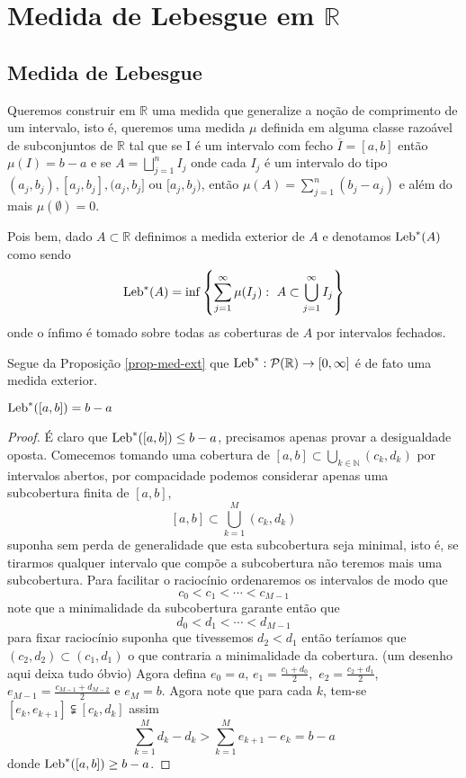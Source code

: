 \chapter[Aula 3]{Medida de Lebesgue em $\mathbb{R}$}
\chaptermark{}






\section*{Medida de Lebesgue}


Queremos construir em $\mathbb{R}$ uma medida que 
generalize a noção de comprimento de  
um intervalo, isto é, queremos uma medida  
$\mu$ definida em alguma classe razoável de 
subconjuntos de $\mathbb{R}$ tal que se I é um intervalo
com fecho $\overline{I}=[a,b]$ então $\mu(I)=b-a$ 
e se $A=\bigsqcup_{j=1}^nI_j$ onde cada $I_j$ 
é um intervalo do tipo $(a_j,b_j), [a_j,b_j],(a_j,b_j]$ ou $[a_j,b_j)$,  
então $\mu(A)=\sum_{j=1}^n(b_j-a_j)$ e
além do mais $\mu(\emptyset)=0$.



Pois bem, dado $A\subset \mathbb{R}$ 
definimos a medida exterior de $A$ e 
denotamos $\textnormal{Leb}^{*}(A)$ como sendo 
$$
\textnormal{Leb}^{*}(A)=\inf 
				\left\{
					\sum_{j=1}^\infty \mu(I_j):~ A\subset \bigcup_{j=1}^\infty I_j 
				\right\}
$$
onde o ínfimo é tomado sobre todas as coberturas de $A$ por intervalos fechados.  

Segue da Proposição \ref{prop-med-ext} que 
$\textnormal{Leb}^{*}:\mathcal{P}(\mathbb{R})\to[0,\infty]$ é de fato uma medida exterior.

\begin{lema}\label{LEB 2}
$\textnormal{Leb}^{*}([a,b])=b-a$
\end{lema}

\begin{proof}
É claro que $\textnormal{Leb}^{*}([a,b])\leq b-a$, 
precisamos apenas provar a desigualdade oposta. 
Comecemos tomando uma cobertura de 
$[a,b]\subset \bigcup_{k\in \mathbb{N}} (c_k,d_k)$  
por intervalos abertos, por compacidade podemos considerar 
apenas uma subcobertura finita de $[a,b]$, 
$$
[a,b]\subset \bigcup_{k=1}^M(c_k,d_k)
$$
suponha sem perda de generalidade que esta subcobertura seja minimal, 
isto é, se tirarmos qualquer intervalo que compõe a subcobertura 
não teremos mais uma subcobertura. Para facilitar o raciocínio 
ordenaremos os intervalos de modo que 
$$
c_0<c_1<\cdots<c_{M-1}
$$
note que a minimalidade da subcobertura garante então que 
$$
d_0<d_1<\cdots<d_{M-1}
$$
para fixar raciocínio  suponha que tivessemos $d_2<d_1$ 
então teríamos que $(c_2,d_2)\subset (c_1,d_1)$ o 
que contraria a minimalidade da cobertura. 
({\red um desenho aqui deixa tudo óbvio}) 
Agora defina 
$e_0=a$, $e_1=\frac{c_1+d_0}{2},$ $e_2=\frac{c_2+d_1}{2}$,
$e_{M-1}=\frac{c_{M-1}+d_{M-2}}{2}$ e $e_{M}=b.$  
Agora note que  para cada $k$, 
tem-se $[e_k,e_{k+1}]\subsetneqq [c_k,d_k]$ assim 
$$
\sum_{k=1}^M d_k-d_k>\sum_{k=1}^M e_{k+1}-e_k=b-a
$$ 
donde $\textnormal{Leb}^{*}([a,b])\geq b-a$.

\end{proof}

